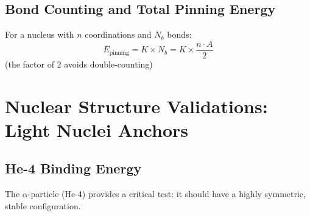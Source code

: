 \documentclass[11pt,a4paper]{article}
\begin{document}
\subsection{Bond Counting and Total Pinning Energy}

For a nucleus with $n$ coordinations and $N_b$ bonds:
\begin{equation}
    E_{\text{pinning}} = K \times N_b = K \times \frac{n \cdot A}{2}
\end{equation}
(the factor of 2 avoids double-counting)

\section{Nuclear Structure Validations: Light Nuclei Anchors}
\label{sec:light_nuclei}

\subsection{He-4 Binding Energy}

The $\alpha$-particle (He-4) provides a critical test: it should have a highly symmetric, stable configuration.
\end{document}
